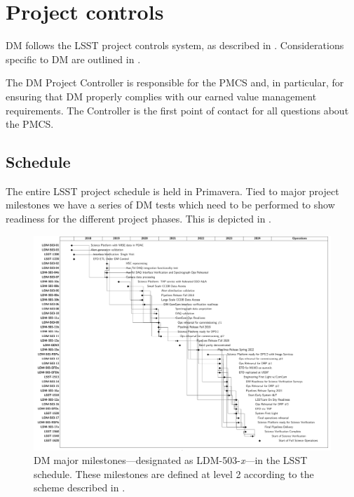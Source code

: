 \newpage
\section{Project controls}\label{sect:dmpc}

DM follows the LSST project controls system, as described in .
Considerations specific to DM are outlined in .

The DM Project Controller is responsible for the PMCS and, in particular, for ensuring that DM properly complies with our earned value management requirements.
The Controller is the first point of contact for all questions about the PMCS.

\subsection{Schedule}\label{sect:schedule}

The entire LSST project schedule is held in Primavera.
Tied to major project milestones we have a series of DM tests which need to be performed to show readiness for the different project phases.
This is depicted in .

\begin{figure}[htbp]
	\begin{center}
		 \includegraphics[width=\textwidth]{gantt}
		 \caption{DM major milestones---designated as LDM-503-\textit{x}---in
         the LSST schedule. These milestones are defined at level 2 according
         to the scheme described in .}
         \label{fig:schedule}
	 \end{center}
 \end{figure}

